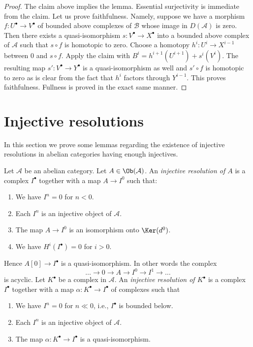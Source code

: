 \begin{proof}
\medskip\noindent
The claim above implies the lemma. Essential surjectivity is immediate
from the claim. Let us prove faithfulness. Namely, suppose we have
a morphism $f : U^\bullet \to V^\bullet$ of bounded above complexes
of $\mathcal{B}$ whose image in $D(\mathcal{A})$ is zero. Then
there exists a quasi-isomorphism $s : V^\bullet \to X^\bullet$
into a bounded above complex of $\mathcal{A}$ such that
$s \circ f$ is homotopic to zero. Choose a homotopy
$h^i : U^i \to X^{i - 1}$ between $0$ and $s \circ f$.
Apply the claim with $B^i = h^{i + 1}(U^{i + 1}) + s^i(V^i)$.
The resulting map $s' : V^\bullet \to Y^\bullet$
is a quasi-isomorphism as well and $s' \circ f$ is homotopic
to zero as is clear from the fact that $h^i$ factors through $Y^{i - 1}$.
This proves faithfulness. Fullness is proved in the
exact same manner.
\end{proof}





\section{Injective resolutions}
\label{section-injective-resolutions}

\noindent
In this section we prove some lemmas regarding the existence
of injective resolutions in abelian categories having enough injectives.

\begin{definition}
\label{definition-injective-resolution}
Let $\mathcal{A}$ be an abelian category.
Let $A \in \Ob(\mathcal{A})$.
An {\it injective resolution of $A$} is a complex
$I^\bullet$ together with a map $A \to I^0$ such
that:
\begin{enumerate}
\item We have $I^n = 0$ for $n < 0$.
\item Each $I^n$ is an injective object of $\mathcal{A}$.
\item The map $A \to I^0$ is an isomorphism onto $\Ker(d^0)$.
\item We have $H^i(I^\bullet) = 0$ for $i > 0$.
\end{enumerate}
Hence $A[0] \to I^\bullet$ is a quasi-isomorphism.
In other words the complex
$$
\ldots \to 0 \to A \to I^0 \to I^1 \to \ldots
$$
is acyclic.
Let $K^\bullet$ be a complex in $\mathcal{A}$.
An {\it injective resolution of $K^\bullet$} is a complex
$I^\bullet$ together with a map $\alpha : K^\bullet \to I^\bullet$
of complexes such that
\begin{enumerate}
\item We have $I^n = 0$ for $n \ll 0$, i.e., $I^\bullet$ is bounded below.
\item Each $I^n$ is an injective object of $\mathcal{A}$.
\item The map $\alpha : K^\bullet \to I^\bullet$ is a
quasi-isomorphism.
\end{enumerate}
\end{definition}


